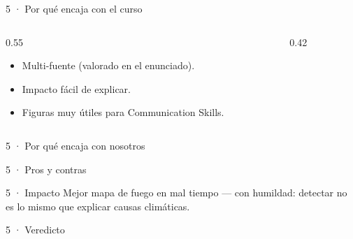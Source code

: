 \begin{frame}{5 · Por qué encaja con el curso}
  \begin{columns}[T]
    \begin{column}{0.55\textwidth}
      \begin{itemize}
        \item Multi-fuente (valorado en el enunciado).
        \item Impacto fácil de explicar.
        \item Figuras muy útiles para Communication Skills.
      \end{itemize}
    \end{column}
    \begin{column}{0.42\textwidth}
    \end{column}
  \end{columns}
\end{frame}

\begin{frame}{5 · Por qué encaja con nosotros}
\end{frame}

\begin{frame}{5 · Pros y contras}
\end{frame}

\begin{frame}{5 · Impacto}
  Mejor mapa de fuego en mal tiempo --- con humildad: detectar no es lo mismo que explicar causas climáticas.
\end{frame}

\begin{frame}{5 · Veredicto}
\end{frame}
